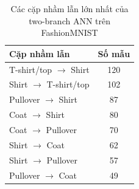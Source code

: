 \begin{table}[H]
\centering
\caption{Các cặp nhầm lẫn lớn nhất của two-branch ANN trên FashionMNIST}
\label{tab:fashion-mnist-two-branch-top-errors}
\begin{tabular}{l c}
\toprule
Cặp nhầm lẫn & Số mẫu \\
\midrule
T-shirt/top $\rightarrow$ Shirt & 120 \\
Shirt $\rightarrow$ T-shirt/top & 102 \\
Pullover $\rightarrow$ Shirt & 87 \\
Coat $\rightarrow$ Shirt & 80 \\
Coat $\rightarrow$ Pullover & 70 \\
Shirt $\rightarrow$ Coat & 62 \\
Shirt $\rightarrow$ Pullover & 57 \\
Pullover $\rightarrow$ Coat & 49 \\
\bottomrule
\end{tabular}
\end{table}
